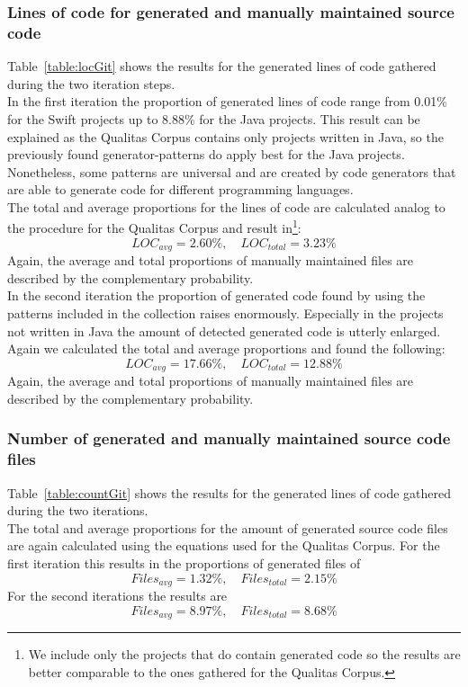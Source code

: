 \subsubsection{Lines of code for generated and manually maintained source code}
Table~\ref{table:locGit} shows the results for the generated lines of code gathered during the two iteration steps.\\
In the first iteration the proportion of generated lines of code range from 0.01\% for the Swift projects up to 8.88\% for the Java projects. This result can be explained as the Qualitas Corpus contains only projects written in Java, so the previously found generator-patterns do apply best for the Java projects. Nonetheless, some patterns are universal and are created by code generators that are able to generate code for different programming languages.\\
The total and average proportions for the lines of code are calculated analog to the procedure for the Qualitas Corpus and result in\footnote{
	\label{note:onlyGenerated}
	We include only the projects that do contain generated code so the results are better comparable to the ones gathered for the Qualitas Corpus.
}:
\begin{equation}
	\label{eq:locGit_1}
	LOC_{avg} = 2.60\%, \quad LOC_{total} = 3.23\%
\end{equation}
Again, the average and total proportions of manually maintained files are described by the complementary probability.\\
In the second iteration the proportion of generated code found by using the patterns included in the collection raises enormously. Especially in the projects not written in Java the amount of detected generated code is utterly enlarged.\\
Again we calculated the total and average proportions and found the following:
\begin{equation}
\label{eq:locGit_2}
LOC_{avg} = 17.66\%, \quad LOC_{total} = 12.88\%
\end{equation}
Again, the average and total proportions of manually maintained files are described by the complementary probability.

\subsubsection{Number of generated and manually maintained source code files}
Table~\ref{table:countGit} shows the results for the generated lines of code gathered during the two iterations.\\
The total and average proportions for the amount of generated source code files are again calculated using the equations used for the Qualitas Corpus.
For the first iteration this results in the proportions of generated files of
\begin{equation}
\label{eq:countGit_1}
	Files_{avg} = 1.32\%, \quad Files_{total} = 2.15\%
\end{equation} 
For the second iterations the results are 
\begin{equation}
\label{eq:countGit_2}
Files_{avg} = 8.97\%, \quad Files_{total} = 8.68\%
\end{equation} 

